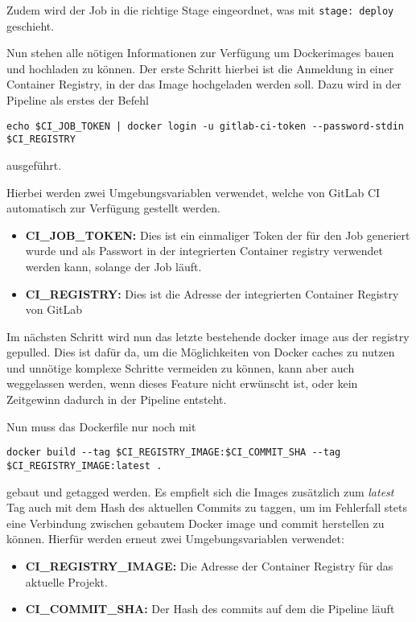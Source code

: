 Zudem wird der Job in die richtige Stage eingeordnet, was mit \texttt{stage: deploy} geschieht.

Nun stehen alle nötigen Informationen zur Verfügung um Dockerimages bauen und hochladen zu können.
Der erste Schritt hierbei ist die Anmeldung in einer Container Registry, in der das Image hochgeladen werden soll.
Dazu wird in der Pipeline als erstes der Befehl
\begin{verbatim}
echo $CI_JOB_TOKEN | docker login -u gitlab-ci-token --password-stdin $CI_REGISTRY
\end{verbatim}
ausgeführt.

Hierbei werden zwei Umgebungsvariablen verwendet, welche von GitLab CI automatisch zur Verfügung gestellt werden.~\cite{PredefinedVariablesReference}
\begin{itemize}
    \item \textbf{CI\_JOB\_TOKEN:} Dies ist ein einmaliger Token der für den Job generiert wurde und als Passwort in der integrierten Container registry verwendet werden kann, solange der Job läuft.
    \item \textbf{CI\_REGISTRY:} Dies ist die Adresse der integrierten Container Registry von GitLab
\end{itemize}

Im nächsten Schritt wird nun das letzte bestehende docker image aus der registry gepulled.
Dies ist dafür da, um die Möglichkeiten von Docker caches zu nutzen und unnötige komplexe Schritte vermeiden zu können, kann aber auch weggelassen werden, wenn dieses Feature nicht erwünscht ist, oder kein Zeitgewinn dadurch in der Pipeline entsteht.

Nun muss das Dockerfile nur noch mit
\begin{verbatim}
docker build --tag $CI_REGISTRY_IMAGE:$CI_COMMIT_SHA --tag $CI_REGISTRY_IMAGE:latest .
\end{verbatim}

gebaut und getagged werden.
Es empfielt sich die Images zusätzlich zum \textit{latest} Tag auch mit dem Hash des aktuellen Commits zu taggen, um im Fehlerfall stets eine Verbindung zwischen gebautem Docker image und commit herstellen zu können.
Hierfür werden erneut zwei Umgebungsvariablen verwendet:\cite{PredefinedVariablesReference}
\begin{itemize}
    \item \textbf{CI\_REGISTRY\_IMAGE:} Die Adresse der Container Registry für das aktuelle Projekt.
    \item \textbf{CI\_COMMIT\_SHA:} Der Hash des commits auf dem die Pipeline läuft
\end{itemize}

